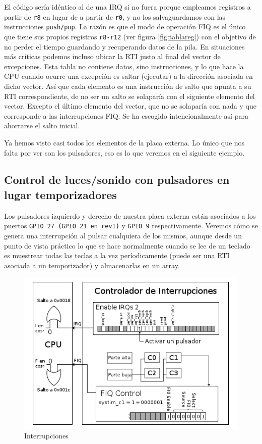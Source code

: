 El código sería idéntico al de una IRQ si no fuera porque empleamos registros a partir de
{\tt r8} en lugar de a partir de {\tt r0}, y no los salvaguardamos con las instrucciones
{\tt push/pop}. La razón es que el modo de operación FIQ es el único que tiene sus propios
registros {\tt r8-r12} (ver figura \ref{fig:tablareg}) con el objetivo de no perder el tiempo
guardando y recuperando datos de la pila. En situaciones más críticas podemos incluso ubicar
la RTI justo al final del vector de excepciones. Esta tabla no contiene datos, sino instrucciones,
y lo que hace la CPU cuando ocurre una excepción es saltar (ejecutar) a la dirección asociada en
dicho vector. Así que cada elemento es una instrucción de salto que apunta a su RTI
correspondiente, de no ser un salto se solaparía con el siguiente elemento del vector. Excepto
el último elemento del vector, que no se solaparía con nada y que corresponde a las
interrupciones FIQ. Se ha escogido intencionalmente así para ahorrarse el salto inicial.

Ya hemos visto casi todos los elementos de la placa externa. Lo único que nos falta por ver
son los pulsadores, eso es lo que veremos en el siguiente ejemplo.

\subsection{Control de luces/sonido con pulsadores en lugar temporizadores}

Los pulsadores izquierdo y derecho de nuestra placa externa están asociados a los
puertos {\tt GPIO 27 (GPIO 21 en rev1)} y {\tt GPIO 9} respectivamente. Veremos
cómo se genera una interrupción al pulsar cualquiera de los mismos, aunque desde
un punto de vista práctico lo que se hace normalmente cuando se lee de un teclado
es muestrear todas las teclas a la vez períodicamente
(puede ser una RTI asociada a un temporizador) y almacenarlas en un array.

\begin{figure}[h]
  \centering
    \includegraphics[width=14cm]{graphs/inter5.png}
  \caption{Interrupciones}
  \label{fig:inter5}
\end{figure}

